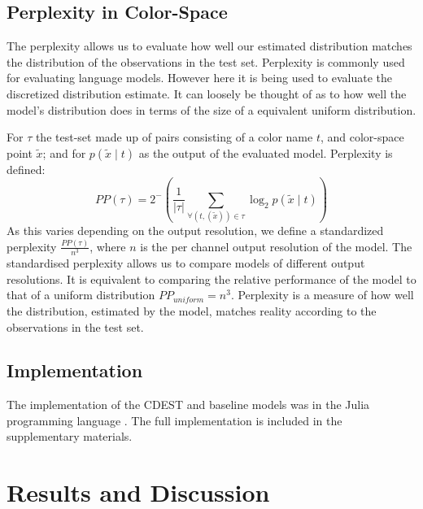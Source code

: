 \documentclass[11pt,a4paper]{article}
\newcommand{\parencite}{\citep}
\begin{document}
\subsection{Perplexity in Color-Space}
The perplexity allows us to evaluate how well our estimated distribution matches the distribution of the observations in the test set.
Perplexity is commonly used for evaluating language models. However here it is being used to evaluate the discretized distribution estimate.
It can loosely be thought of as to how well the model's distribution does in terms of the size of a equivalent uniform distribution.

For $\tau$ the test-set made up of pairs consisting of a color name $t$, and color-space point $\tilde{x}$;
and for $p(\tilde{x}\mid t)$ as the output of the evaluated model.
Perplexity is defined:
\[
 PP(\tau) = 2^-{\left(
 	\frac{1}{|\tau|} 
 	\sum_{
	 		\forall(t,(\tilde{x})) \in \tau}
 	 \log_2 p(\tilde{x}\mid t)\right)}
\]
As this varies depending on the output resolution,
we define a standardized perplexity $\frac{PP(\tau)}{n^3}$, where $n$ is the per channel output resolution of the model.
The standardised perplexity allows us to compare models of different output resolutions.
It is equivalent to comparing the relative performance of the model to that of a uniform distribution $PP_{uniform}=n^3$.
Perplexity is a measure of how well the distribution, estimated by the model, matches reality according to the observations in the test set.

\subsection{Implementation}
The implementation of the CDEST and baseline models was in the Julia programming language \parencite{Julia}.
The full implementation is included in the supplementary materials.


\section{Results and Discussion}\label{sec:results-and-discussion}
\end{document}
